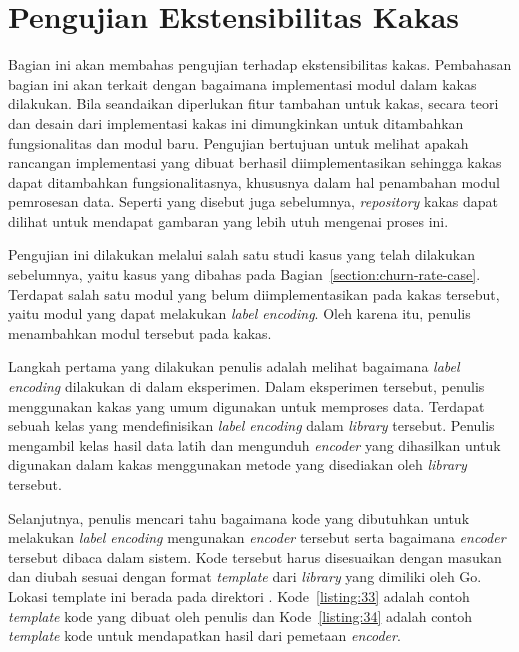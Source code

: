 
\section{Pengujian Ekstensibilitas Kakas}

Bagian ini akan membahas pengujian terhadap ekstensibilitas kakas.
Pembahasan bagian ini akan terkait dengan bagaimana implementasi modul dalam kakas dilakukan.
Bila seandaikan diperlukan fitur tambahan untuk kakas, secara teori dan desain dari implementasi kakas ini dimungkinkan untuk ditambahkan fungsionalitas dan modul baru.
Pengujian bertujuan untuk melihat apakah rancangan implementasi yang dibuat berhasil diimplementasikan sehingga kakas dapat ditambahkan fungsionalitasnya, khususnya dalam hal penambahan modul pemrosesan data.
Seperti yang disebut juga sebelumnya, \textit{repository} kakas dapat dilihat untuk mendapat gambaran yang lebih utuh mengenai proses ini.

Pengujian ini dilakukan melalui salah satu studi kasus yang telah dilakukan sebelumnya, yaitu kasus yang dibahas pada Bagian~\ref{section:churn-rate-case}.
Terdapat salah satu modul yang belum diimplementasikan pada kakas tersebut, yaitu modul yang dapat melakukan \textit{label encoding}.
Oleh karena itu, penulis menambahkan modul tersebut pada kakas.

Langkah pertama yang dilakukan penulis adalah melihat bagaimana \textit{label encoding} dilakukan di dalam eksperimen.
Dalam eksperimen tersebut, penulis menggunakan kakas  yang umum digunakan untuk memproses data.
Terdapat sebuah kelas yang mendefinisikan \textit{label encoding} dalam \textit{library} tersebut.
Penulis mengambil kelas hasil data latih dan mengunduh \textit{encoder} yang dihasilkan untuk digunakan dalam kakas menggunakan metode yang disediakan oleh \textit{library} tersebut.

Selanjutnya, penulis mencari tahu bagaimana kode yang dibutuhkan untuk melakukan \textit{label encoding} mengunakan \textit{encoder} tersebut serta bagaimana \textit{encoder} tersebut dibaca dalam sistem.
Kode tersebut harus disesuaikan dengan masukan dan diubah sesuai dengan format \textit{template} dari \textit{library}  yang dimiliki oleh Go.
Lokasi template ini berada pada direktori .
Kode~\ref{listing:33} adalah contoh \textit{template} kode yang dibuat oleh penulis dan Kode~\ref{listing:34} adalah contoh \textit{template} kode untuk mendapatkan hasil dari pemetaan \textit{encoder}.

